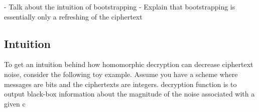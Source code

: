 - Talk about the intuition of bootstrapping
- Explain that bootstrapping is essentially only a refreshing of the ciphertext

\subsection*{Intuition}
To get an intuition behind how homomorphic decryption can decrease ciphertext noise, consider the following toy example. Assume you have a scheme where messages are bits and the ciphertexts are integers.  decryption function is to output black-box information about the magnitude of the noise associated with a given c  